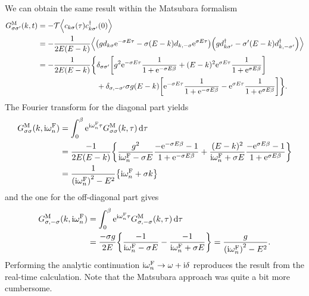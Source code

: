 \documentclass[english, parskip=full]{scrartcl}
\begin{document}
We can obtain the same result within the Matsubara formalism
\begin{align}
G_{\sigma\sigma'}^\M(k,t) &= -\mathcal{T} \bra*{c_{k\sigma}(\tau) c_{k\sigma'}^\dagger(0)} \\
&= -\frac{1}{2E(E-k)} \bra*{ \kla*{gd_{k\sigma} \powe{- \sigma E\tau} - \sigma (E-k)d_{k,-\sigma} \powe{\sigma E\tau} } \kla*{gd_{k\sigma'}^\dagger -\sigma' (E-k) d_{k,-\sigma'}^\dagger} }\\
&= -\frac{1}{2E(E-k)} \bsplit{\klc[\bigg]{&\delta_{\sigma\sigma'} \klb*{g^2 \powe{-\sigma E\tau} \frac{1}{1 + \powe{-\sigma E\beta}} + (E-k)^2\powe{\sigma E\tau} \frac{1}{1 + \powe{\sigma E\beta}} } \\
&+\delta_{\sigma,-\sigma'} \sigma g(E-k) \klb*{\powe{-\sigma E\tau} \frac{1}{1 + \powe{-\sigma E\beta}} - \powe{\sigma E\tau} \frac{1}{1 + \powe{\sigma E\beta}}} }.}
\end{align}
The Fourier transform for the diagonal part yields
\begin{align}
G_{\sigma\sigma}^\M(k,\i\omega_n^\F) &= \intx{0}{\beta}{\powe{\i\omega_n^\F\tau} G_{\sigma\sigma}^\M(k,\tau)}{\tau}\\
&= \frac{-1}{2E(E-k)} \klc*{\frac{g^2}{\i\omega_n^\F - \sigma E} \frac{-\powe{-\sigma E\beta} - 1}{1 + \powe{-\sigma E\beta}} + \frac{(E-k)^2}{\i\omega_n^\F + \sigma E} \frac{-\powe{\sigma E\beta} - 1}{1 + \powe{\sigma E\beta}}}\\
&= \frac{1}{\kla*{\i\omega_n^\F}^2 - E^2} \klc*{\i\omega_n^\F + \sigma k}
\end{align}
and the one for the off-diagonal part gives
\begin{align}
G_{\sigma,-\sigma}^\M(k,\i\omega_n^\F) &= \intx{0}{\beta}{\powe{\i\omega_n^\F\tau} G_{\sigma,-\sigma}^\M(k,\tau)}{\tau}\\
&= \frac{-\sigma g}{2E} \klc*{\frac{-1}{\i\omega_n^\F - \sigma E} - \frac{-1}{\i\omega_n^\F + \sigma E}} = \frac{g}{\kla*{\i\omega_n^\F}^2 - E^2}.
\end{align}
Performing the analytic continuation $\text{i}\omega_n^{\text{F}} \rightarrow \omega + \text{i}\delta$ reproduces the result from the real-time calculation.
Note that the Matsubara approach was quite a bit more cumbersome.
\end{document}
